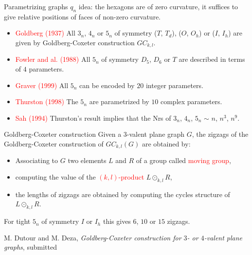 \documentclass[%
pdf,
colorBG,
slideColor,
]{prosper}
\begin{document}
\begin{slide}{Parametrizing graphs $q_n$}
idea: the hexagons are of zero curvature, it suffices to give relative positions of faces of non-zero curvature.
\begin{itemize}
\item \textcolor{red}{Goldberg (1937)} All $3_n$, $4_n$ or $5_n$ of symmetry ($T$, $T_d$), ($O$, $O_h$) or ($I$, $I_h$) are given by Goldberg-Coxeter construction $GC_{k,l}$.
\item \textcolor{red}{Fowler and al. (1988)} All $5_n$ of symmetry $D_5$, $D_6$ or $T$ are described in terms of $4$ parameters.
\item \textcolor{red}{Graver (1999)} All $5_n$ can be encoded by $20$ integer parameters.
\item \textcolor{red}{Thurston (1998)} The $5_n$ are parametrized by $10$ complex parameters.
\item \textcolor{red}{Sah (1994)} Thurston's result implies that the Nrs of $3_n$, $4_n$, $5_n$ $\sim$ $n$, $n^3$, $n^9$.
\end{itemize}




\end{slide}






\begin{slide}{Goldberg-Coxeter construction}
Given a $3$-valent plane graph $G$, the zigzags of the Goldberg-Coxeter construction of $GC_{k,l}(G)$ are obtained by:

\begin{itemize}
\item Associating to $G$ two elements $L$ and $R$ of a group called \textcolor{red}{moving group},
\item computing the value of the \textcolor{red}{$(k,l)$-product} $L\odot_{k,l} R$,
\item the lengths of zigzags are obtained by computing the cycles structure of $L\odot_{k,l} R$.
\end{itemize}
For tight $5_n$ of symmetry $I$ or $I_h$ this gives $6$, $10$ or $15$ zigzags.


{\scriptsize

M. Dutour and M. Deza, {\em Goldberg-Coxeter construction for $3$- or $4$-valent plane graphs}, submitted
}


\end{slide}
\end{document}
